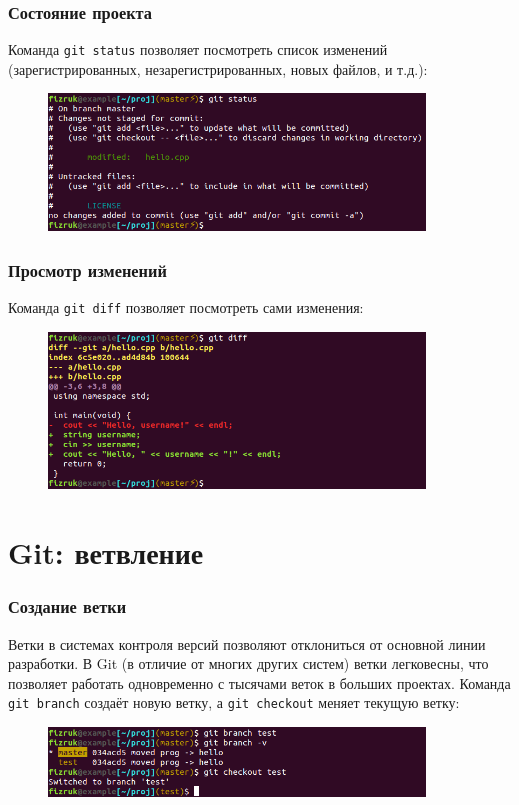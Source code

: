 \documentclass{beamer}
\begin{document}
\begin{frame}
  \frametitle{Состояние проекта}
  Команда \texttt{git status} позволяет посмотреть список изменений
  (зарегистрированных, незарегистрированных, новых файлов, и т.д.):

  \begin{figure}
    \includegraphics[width=10cm]{images/git-status.png}
  \end{figure}
\end{frame}

\begin{frame}
  \frametitle{Просмотр изменений}
  Команда \texttt{git diff} позволяет посмотреть сами изменения:

  \begin{figure}
    \includegraphics[width=10cm]{images/git-diff.png}
  \end{figure}
\end{frame}

\section{Git: ветвление}

\begin{frame}
  \frametitle{Создание ветки}
  Ветки в системах контроля версий позволяют отклониться от основной
  линии разработки. В Git (в отличие от многих других систем) ветки
  легковесны, что позволяет работать одновременно с тысячами веток
  в больших проектах.
  Команда \texttt{git branch} создаёт новую ветку, а \texttt{git checkout}
  меняет текущую ветку:

  \begin{figure}
    \includegraphics[width=10cm]{images/git-branch.png}
  \end{figure}
\end{frame}
\end{document}
